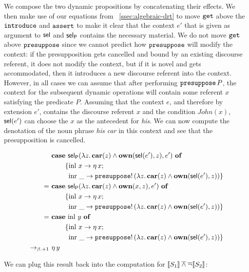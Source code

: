 We compose the two dynamic propositions by concatenating their effects. We
then make use of our equations from ~\ref{ssec:algebraic-drt} to move
$\mathtt{get}$ above the $\mathtt{introduce}$ and $\mathtt{assert}$ to make it clear
that the context $e'$ that is given as argument to $\textsf{sel}$ and $\textsf{sel}_{\textsf{P}}$
contains the necessary material. We do not move $\mathtt{get}$ above
$\mathtt{presuppose}$ since we cannot predict how $\mathtt{presuppose}$ will modify
the context: if the presupposition gets cancelled and bound by an existing
discourse referent, it does not modify the context, but if it is novel and
gets accommodated, then it introduces a new discourse referent into the
context. However, in all cases we can assume that after performing
$\mathtt{presuppose}\,P$, the context for the subsequent dynamic
operations will contain some referent $x$ satisfying the predicate
$P$. Assuming that the context $e$, and therefore by extension $e'$,
contains the discourse referent $x$ and the condition $John(x)$, $\textsf{sel}(e')$
can choose the $x$ as the antecedent for \emph{his}. We can now compute the
denotation of the noun phrase \emph{his car} in this context and see that
the presupposition is cancelled.

\begin{align*}
  &\text{\textbf{case} $\textsf{sel}_{\textsf{P}}(\lambda z.\, \textbf{car}(z) \land \textbf{own}(\textsf{sel}(e'), z), e')$ \textbf{of}} \\ &\qquad \{\operatorname{inl}\,x \to \eta\,x; \\ &\qquad \ \operatorname{inr}\,\_ \to \mathtt{presuppose}!\,(\lambda z.\, \textbf{car}(z) \land \textbf{own}(\textsf{sel}(e'), z)) \} \\
=\ &\text{\textbf{case} $\textsf{sel}_{\textsf{P}}(\lambda z.\, \textbf{car}(z) \land \textbf{own}(x, z), e')$ \textbf{of}} \\ &\qquad \{\operatorname{inl}\,x \to \eta\,x; \\ &\qquad \ \operatorname{inr}\,\_ \to \mathtt{presuppose}!\,(\lambda z.\, \textbf{car}(z) \land \textbf{own}(\textsf{sel}(e'), z)) \} \\
=\ &\text{\textbf{case} $\operatorname{inl}\,y$ \textbf{of}} \\ &\qquad \{\operatorname{inl}\,x \to \eta\,x; \\ &\qquad \ \operatorname{inr}\,\_ \to \mathtt{presuppose}!\,(\lambda z.\, \textbf{car}(z) \land \textbf{own}(\textsf{sel}(e'), z)) \} \\
\to_{\beta.+1}\ &\eta\,y
\end{align*}

We can plug this result back into the computation for $\llbracket S_1 \rrbracket \mathbin{\overline{\land}}
\mathop{\overline{\lnot}} \llbracket S_2 \rrbracket$:

